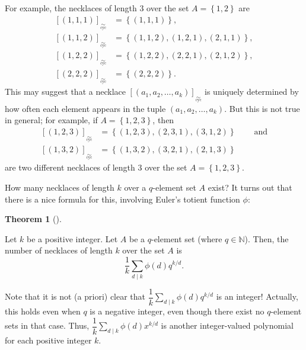\documentclass[numbers=enddot,12pt,final,onecolumn,notitlepage]{scrartcl}%
\numberwithin{exer}{subsection}
\theoremstyle{definition}
\newtheorem{theo}{Theorem}[subsection]
\newenvironment{theorem}[1][]
{\begin{theo}[#1]\begin{leftbar}}
{\end{leftbar}\end{theo}}
\let\sumnonlimits\sum
\renewcommand{\sum}{\sumnonlimits\limits}
\begin{document}
For example, the necklaces of length $3$ over the set $A=\left\{  1,2\right\}
$ are%
\begin{align*}
\left[  \left(  1,1,1\right)  \right]  _{\underset{\operatorname*{cyc}}{\sim
}}  &  =\left\{  \left(  1,1,1\right)  \right\}  ,\\
\left[  \left(  1,1,2\right)  \right]  _{\underset{\operatorname*{cyc}}{\sim
}}  &  =\left\{  \left(  1,1,2\right)  ,\left(  1,2,1\right)  ,\left(
2,1,1\right)  \right\}  ,\\
\left[  \left(  1,2,2\right)  \right]  _{\underset{\operatorname*{cyc}}{\sim
}}  &  =\left\{  \left(  1,2,2\right)  ,\left(  2,2,1\right)  ,\left(
2,1,2\right)  \right\}  ,\\
\left[  \left(  2,2,2\right)  \right]  _{\underset{\operatorname*{cyc}}{\sim
}}  &  =\left\{  \left(  2,2,2\right)  \right\}  .
\end{align*}
This may suggest that a necklace $\left[  \left(  a_{1},a_{2},\ldots
,a_{k}\right)  \right]  _{\underset{\operatorname*{cyc}}{\sim}}$ is uniquely
determined by how often each element appears in the tuple $\left(  a_{1}%
,a_{2},\ldots,a_{k}\right)  $. But this is not true in general; for example,
if $A=\left\{  1,2,3\right\}  $, then%
\begin{align*}
\left[  \left(  1,2,3\right)  \right]  _{\underset{\operatorname*{cyc}}{\sim
}}  &  =\left\{  \left(  1,2,3\right)  ,\left(  2,3,1\right)  ,\left(
3,1,2\right)  \right\}  \ \ \ \ \ \ \ \ \ \ \text{and}\\
\left[  \left(  1,3,2\right)  \right]  _{\underset{\operatorname*{cyc}}{\sim
}}  &  =\left\{  \left(  1,3,2\right)  ,\left(  3,2,1\right)  ,\left(
2,1,3\right)  \right\}
\end{align*}
are two different necklaces of length $3$ over the set $A=\left\{
1,2,3\right\}  $.

How many necklaces of length $k$ over a $q$-element set $A$ exist? It turns
out that there is a nice formula for this, involving Euler's totient function
$\phi$:

\begin{theorem}
\label{thm.eqrel.eqcl.necklace-count}Let $k$ be a positive integer. Let $A$ be
a $q$-element set (where $q\in\mathbb{N}$). Then, the number of necklaces of
length $k$ over the set $A$ is%
\[
\dfrac{1}{k}\sum_{d\mid k}\phi\left(  d\right)  q^{k/d}.
\]

\end{theorem}

Note that it is not (a priori) clear that $\dfrac{1}{k}\sum_{d\mid k}%
\phi\left(  d\right)  q^{k/d}$ is an integer! Actually, this holds even when
$q$ is a negative integer, even though there exist no $q$-element sets in that
case. Thus, $\dfrac{1}{k}\sum_{d\mid k}\phi\left(  d\right)  x^{k/d}$ is
another integer-valued polynomial for each positive integer $k$.
\end{document}
